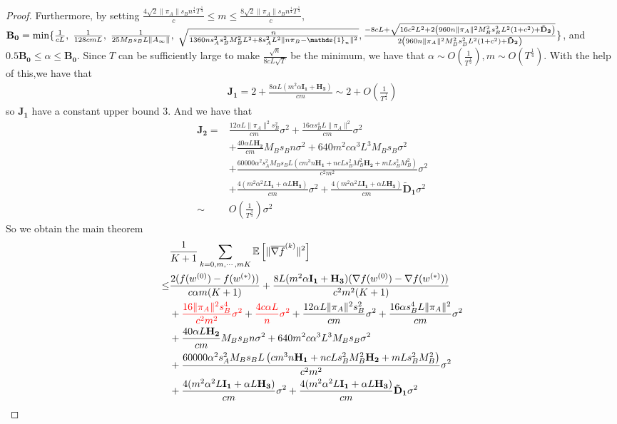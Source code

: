 \documentclass{article}
\newcommand{\EE}[1]{\mathbb{E}\left[#1\right]}
\newcommand{\norm}[1]{\| #1 \|}
\newcommand{\one}{\mathds{1}_n}
\begin{document}
\begin{proof}
  Furthermore, by setting $\frac{4\sqrt{2}\norm{\pi_A}s_Bn^{\frac{1}{4}}T^{\frac{1}{4}}}{c}\leq m \leq \frac{8\sqrt{2}\norm{\pi_A}s_Bn^{\frac{1}{4}}T^{\frac{1}{4}}}{c}$, $\mathbf{B_0}=\min\{\frac{1}{cL} ,\;\frac{1}{128cmL},\;\frac{1}{25M_Bs_BL\norm{A_{\infty}}},\; \sqrt{\frac{n}{1360ns_A^2s_B^2M_B^2L^2+8s_A^2L^2\norm{n\pi_B-\one}^2}},\; \\\frac{-8cL+\sqrt{16c^2L^2+2\left(960n\norm{\pi_A}^2M_B^2s_B^2L^2\left(1+c^2\right)+\mathbf{\tilde{D}_2}\right)}}{2\left(960n\norm{\pi_A}^2M_B^2s_B^2L^2\left(1+c^2\right)+\mathbf{\tilde{D}_2}\right)}\} $, and $0.5\mathbf{B_0}\leq \alpha \leq \mathbf{B_0}$. Since $T$ can be sufficiently large to make $\frac{\sqrt{n}}{8cL\sqrt{T}}$ be the minimum, we have that $\alpha \sim O(\frac{1}{T^{\frac{1}{2}}}), m\sim O(T^{\frac{1}{4}})$. With the help of this,we have that 
  \begin{align*}
    \mathbf{J_1}=2+\frac{8\alpha L(m^2\alpha \mathbf{I_1}+ \mathbf{H_3})}{c m}\sim 2+O(\frac{1}{T^{\frac{1}{4}}})
  \end{align*}
  so $\mathbf{J_1}$ have a constant upper bound $3$. And we have that 
  \begin{align*}
    \mathbf{J_2}=&\frac{12\alpha L\norm{\pi_A}^2s_B^2}{c m}\sigma^2+\frac{16\alpha s_B^4L\norm{\pi_A}^2}{c m}\sigma^2\nonumber\\&+\frac{40\alpha L \mathbf{H_2}}{c m}M_Bs_Bn \sigma^2+640m^2c\alpha^3L^3M_Bs_B\sigma^2\nonumber\\&+\frac{60000\alpha^2 s_A^2M_Bs_BL \left(cm^3n\mathbf{H_1}+nc Ls_B^2M_B^2\mathbf{H_2} +mLs_B^2M_B^2\right)}{c^2m^2}\sigma^2\nonumber\\&+\frac{4(m^2\alpha^2L\mathbf{I_1}+\alpha L \mathbf{H_3})}{c m}\sigma^2+\frac{4(m^2\alpha^2L\mathbf{I_1}+\alpha L \mathbf{H_3})}{c m}\mathbf{\tilde{D}_1}\sigma^2\nonumber\\ \sim& O(\frac{1}{T^{\frac{3}{4}}})\sigma^2 
  \end{align*}
  So we obtain the main theorem
  \begin{align*}
    &\frac{1 }{K+1}\sum_{k=0,m,\cdots,mK}\EE{\norm{\overline{\nabla f}^{(k)}}^2}
  \\\leq& \frac{2(f(w^{(0)})-f(w^{(*)}))}{c\alpha m(K+1)}+\frac{8L(m^2\alpha \mathbf{I_1}+ \mathbf{H_3})(\nabla f(w^{(0)})-\nabla f(w^{(*)}))}{c^2 m^2(K+1)}\nonumber\\&+\textcolor{red}{\frac{16 \norm{\pi_A}^2s_B^4}{c^2 m^2}\sigma^2}+\textcolor{red}{ \frac{4c\alpha L}{n}\sigma^2}+\frac{12\alpha L\norm{\pi_A}^2s_B^2}{c m}\sigma^2+\frac{16\alpha s_B^4L\norm{\pi_A}^2}{c m}\sigma^2\nonumber\\&+\frac{40\alpha L \mathbf{H_2}}{c m}M_Bs_Bn \sigma^2+640m^2c\alpha^3L^3M_Bs_B\sigma^2\nonumber\\&+\frac{60000\alpha^2 s_A^2M_Bs_BL \left(cm^3n\mathbf{H_1}+nc Ls_B^2M_B^2\mathbf{H_2} +mLs_B^2M_B^2\right)}{c^2m^2}\sigma^2\nonumber\\&+\frac{4(m^2\alpha^2L\mathbf{I_1}+\alpha L \mathbf{H_3})}{c m}\sigma^2+\frac{4(m^2\alpha^2L\mathbf{I_1}+\alpha L \mathbf{H_3})}{c m}\mathbf{\tilde{D}_1}\sigma^2

\end{align*}
\end{proof}
\end{document}
